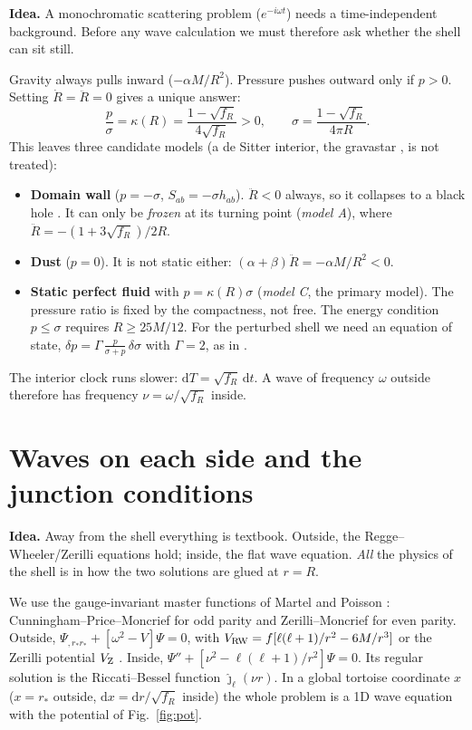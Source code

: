 \documentclass[10pt,a4paper]{article}
\newcommand{\sq}{\sqrt{f_R}}
\newcommand{\dd}{\mathrm{d}}
\newcommand{\idea}[1]{\par\smallskip\noindent\colorbox{idea!8}{\parbox{\dimexpr\linewidth-2\fboxsep}{\small\textbf{\color{idea}Idea.} #1}}\par\smallskip}
\begin{document}
\idea{A monochromatic scattering problem ($e^{-i\omega t}$) needs a time-independent background. Before any wave
calculation we must therefore ask whether the shell can sit still.}

Gravity always pulls inward ($-\alpha M/R^2$). Pressure pushes outward only if $p>0$. Setting $\dot R=\ddot R=0$ gives a unique
answer:
\begin{equation}
\frac{p}{\sigma}=\kappa(R)=\frac{1-\sq}{4\sq}>0,\qquad \sigma=\frac{1-\sq}{4\pi R}.
\label{eq:kappa}
\end{equation}
This leaves three candidate models (a de Sitter interior, the gravastar \cite{Pani09}, is not treated):
\begin{itemize}
\item \textbf{Domain wall} ($p=-\sigma$, $S_{ab}=-\sigma h_{ab}$). $\ddot R<0$ always, so it collapses to a black
hole \cite{IS84}. It can only be \emph{frozen} at its turning point (\emph{model A}), where $\ddot R=-(1+3\sq)/2R$.
\item \textbf{Dust} ($p=0$). It is not static either: $(\alpha+\beta)\ddot R=-\alpha M/R^2<0$.
\item \textbf{Static perfect fluid} with $p=\kappa(R)\sigma$ (\emph{model C}, the primary model). The pressure ratio
is fixed by the compactness, not free. The energy condition $p\le\sigma$ requires $R\ge25M/12$. For the perturbed shell
we need an equation of state, $\delta p=\Gamma\,\frac{p}{\sigma+p}\,\delta\sigma$ with $\Gamma=2$, as in
\cite{PSP26}.
\end{itemize}
The interior clock runs slower: $\dd T=\sq\,\dd t$. A wave of frequency $\omega$ outside therefore has frequency
$\nu=\omega/\sq$ inside.

\section{Waves on each side and the junction conditions}
\idea{Away from the shell everything is textbook. Outside, the Regge--Wheeler/Zerilli equations hold; inside, the flat
wave equation. \emph{All} the physics of the shell is in how the two solutions are glued at $r=R$.}

We use the gauge-invariant master functions of Martel and Poisson \cite{MP05}: Cunningham--Price--Moncrief for odd
parity and Zerilli--Moncrief for even parity. Outside,
$\Psi_{,r_*r_*}+[\omega^2-V]\Psi=0$, with $V_{\rm RW}=f[\ell(\ell+1)/r^2-6M/r^3]$ \cite{RW57} or the Zerilli potential
$V_{\rm Z}$ \cite{Zerilli70}. Inside, $\Psi''+[\nu^2-\ell(\ell+1)/r^2]\Psi=0$. Its regular solution is the Riccati--Bessel
function $\hat\jmath_\ell(\nu r)$. In a global tortoise coordinate $x$ ($x=r_*$ outside, $\dd x=\dd r/\sq$ inside) the
whole problem is a 1D wave equation with the potential of Fig.~\ref{fig:pot}.
\end{document}
